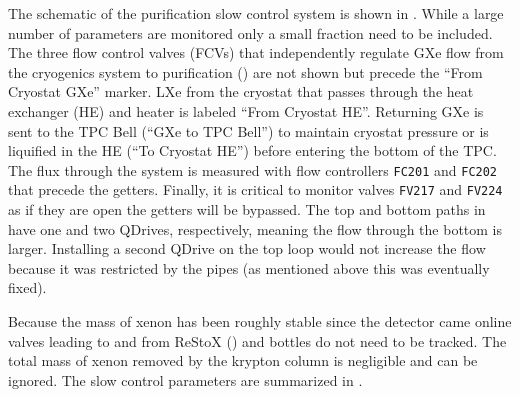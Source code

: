 The schematic of the purification slow control system is shown in .  While a large
number of parameters are monitored only a small fraction need to be included.  The three flow control valves (FCVs) that independently
regulate GXe flow from the cryogenics system to purification () are not shown but precede the
``From Cryostat GXe'' marker.  LXe from the cryostat that passes
through the heat exchanger (HE) and heater is labeled ``From Cryostat HE''.  Returning GXe is sent to the TPC Bell (``GXe to TPC Bell'')
to maintain cryostat pressure or is liquified in the HE (``To Cryostat HE'') before entering the bottom of the TPC.  The flux through the
system is
measured with flow controllers \texttt{FC201} and \texttt{FC202} that precede the getters.  Finally, it is critical to monitor valves
\texttt{FV217} and \texttt{FV224} as
if they are open the getters will be bypassed.  The top and bottom paths in  have one
and two QDrives, respectively, meaning the flow through the bottom is larger.  Installing a second QDrive on the top loop would not
increase the flow because it was restricted by the pipes (as mentioned above this was eventually fixed).

Because the mass of xenon has
been roughly stable since the detector came online valves
leading to and from ReStoX () and bottles do not need to be tracked.  The total mass of xenon removed by the
krypton column is negligible and
can be ignored.  The slow control parameters are summarized in .

\begin{table}
\centering
{}
\caption{Parameters queried from slow control system to calculate \fg and \fl.  Those in
 are highlighted in the color listed.}
\label{tab:electron_lifetime_model_removal_slow_control_pars}
\end{table}

